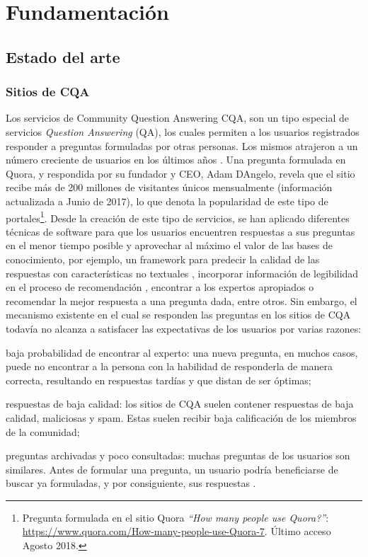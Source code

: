 \newpage \section{Fundamentación}\label{ch:fundamentacion}
\subsection{Estado del arte}
\subsubsection{Sitios de CQA}
\noindent Los servicios de Community Question Answering CQA, son un tipo especial de servicios \textit{Question Answering} (QA), los cuales permiten a los usuarios registrados responder a preguntas formuladas por otras personas. Los mismos atrajeron a un número creciente de usuarios en los últimos años \citep{li2010routing}. Una pregunta formulada en Quora, y respondida por su fundador y CEO, Adam D\textsc{}Angelo, revela que el sitio recibe más de 200 millones de visitantes únicos mensualmente (información actualizada a Junio de 2017), lo que denota la popularidad de este tipo de portales\footnote{Pregunta formulada en el sitio Quora \textit{``How many people use Quora?''}: \url{https://www.quora.com/How-many-people-use-Quora-7}. Último acceso Agosto 2018.}. Desde la creación de este tipo de servicios, se han aplicado diferentes técnicas de software para que los usuarios encuentren respuestas a sus preguntas en el menor tiempo posible y aprovechar al máximo el valor de las bases de conocimiento, por ejemplo, un framework para predecir la calidad de las respuestas con características no textuales \citep{jeon2006framework}, incorporar información de legibilidad en el proceso de recomendación \citep{anuyah2017can}, encontrar a los expertos apropiados \citep{li2010routing} o recomendar la mejor respuesta a una pregunta dada, entre otros. Sin embargo, el mecanismo existente en el cual se responden las preguntas en los sitios de CQA todavía no alcanza a satisfacer las expectativas de los usuarios por varias razones: 
\begin{inparaenum}[(1)]
	\item baja probabilidad de encontrar al experto: una nueva pregunta, en muchos casos, puede no encontrar a la persona con la habilidad de responderla de manera correcta, resultando en respuestas tardías y que distan de ser óptimas; 
	\item respuestas de baja calidad: los sitios de CQA suelen contener respuestas de baja calidad, maliciosas y spam. Estas suelen recibir baja calificación de los miembros de la comunidad; \item preguntas archivadas y poco consultadas: muchas preguntas de los usuarios son similares. Antes de formular una pregunta, un usuario podría beneficiarse de buscar ya formuladas, y por consiguiente, sus respuestas \citep{yang2013cqarank}.
\end{inparaenum}

